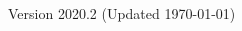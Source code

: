 \documentclass{beamer}
\subtitle[Statistical Indicators]{Topic 02 - Point and Interval Indicators}
\date{May 8th, 2020}
\begin{document}
\begin{CJK}{UTF8}{ipxm}

\begin{frame}
  \maketitle

  \vfill

  \hfill \tiny{Version 2020.2 (Updated \today)}
\end{frame}




\end{CJK}
\end{document}
